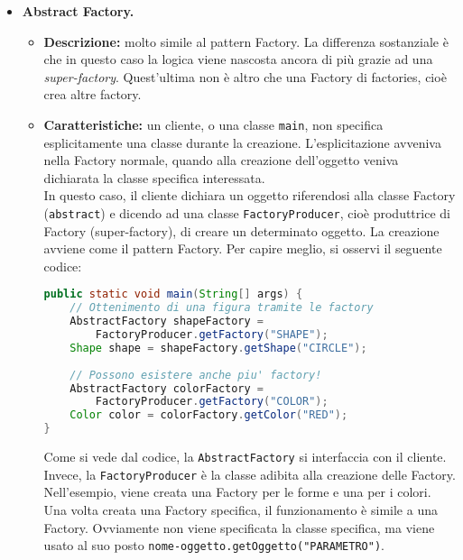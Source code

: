 \documentclass[a4paper,11pt]{article}
\begin{document}
\begin{itemize}
	\item[\ding{42}]  \textbf{Abstract Factory.}
		\begin{itemize}
			\item \textbf{Descrizione:} molto simile al pattern Factory. La differenza sostanziale è che in questo caso la logica viene nascosta ancora di più grazie ad una \emph{super-factory}. Quest'ultima non è altro che una Factory di factories, cioè crea altre factory.
			\item \textbf{Caratteristiche:} un cliente, o una classe \texttt{main}, non specifica esplicitamente una classe durante la creazione. L'esplicitazione avveniva nella Factory normale, quando alla creazione dell'oggetto veniva dichiarata la classe specifica interessata.\\
			In questo caso, il cliente dichiara un oggetto riferendosi alla classe Factory (\texttt{abstract}) e dicendo ad una classe \texttt{FactoryProducer}, cioè produttrice di Factory (super-factory), di creare un determinato oggetto. La creazione avviene come il pattern Factory.
			Per capire meglio, si osservi il seguente codice:
			\begin{lstlisting}[language=Java]
public static void main(String[] args) {
	// Ottenimento di una figura tramite le factory
	AbstractFactory shapeFactory = 
		FactoryProducer.getFactory("SHAPE");
	Shape shape = shapeFactory.getShape("CIRCLE");
	
	// Possono esistere anche piu' factory!
	AbstractFactory colorFactory = 
		FactoryProducer.getFactory("COLOR");
	Color color = colorFactory.getColor("RED");
}
			\end{lstlisting}
			Come si vede dal codice, la \texttt{AbstractFactory} si interfaccia con il cliente. Invece, la \texttt{FactoryProducer} è la classe adibita alla creazione delle Factory. Nell'esempio, viene creata una Factory per le forme e una per i colori.\\
			Una volta creata una Factory specifica, il funzionamento è simile a una Factory. Ovviamente non viene specificata la classe specifica, ma viene usato al suo posto \texttt{nome-oggetto.getOggetto("PARAMETRO")}.
		\end{itemize}	
\end{itemize}

\newpage
\end{document}
